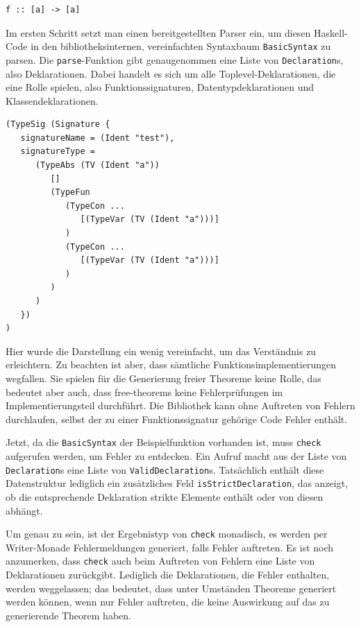 \begin{verbatim}
f :: [a] -> [a]
\end{verbatim}

Im ersten Schritt setzt man einen bereitgestellten Parser ein, um diesen Haskell-Code in den bibliotheksinternen, vereinfachten
Syntaxbaum \texttt{BasicSyntax} zu parsen. Die \texttt{parse}-Funktion gibt genaugenommen eine Liste von \texttt{Declaration}s, also Deklarationen. Dabei handelt es sich um alle Toplevel-Deklarationen, die eine Rolle spielen, also Funktionssignaturen,
Datentypdeklarationen und Klassendeklarationen.


\begin{verbatim}
(TypeSig (Signature {
   signatureName = (Ident "test"),
   signatureType =
      (TypeAbs (TV (Ident "a"))
         []
         (TypeFun
            (TypeCon ...
               [(TypeVar (TV (Ident "a")))]
            )
            (TypeCon ...
               [(TypeVar (TV (Ident "a")))]
            )
         )
      )
   })
)
\end{verbatim}

Hier wurde die Darstellung ein wenig vereinfacht, um das Verständnis zu erleichtern. Zu beachten ist aber, dass sämtliche
Funktionsimplementierungen wegfallen. Sie spielen für die Generierung freier Theoreme keine Rolle, das bedeutet aber auch,
dass free-theorems keine Fehlerprüfungen im Implementierungsteil durchführt. Die Bibliothek kann ohne Auftreten von Fehlern
durchlaufen, selbst der zu einer Funktionssignatur gehörige Code Fehler enthält.

Jetzt, da die \texttt{BasicSyntax} der Beispielfunktion vorhanden ist, muss \texttt{check} aufgerufen werden, um Fehler
zu entdecken. Ein Aufruf macht aus der Liste von \texttt{Declaration}s eine Liste von \texttt{ValidDeclaration}s. Tatsächlich
enthält diese Datenstruktur lediglich ein zusätzliches Feld \texttt{isStrictDeclaration}, das anzeigt, ob die entsprechende
Deklaration strikte Elemente enthält oder von diesen abhängt.

Um genau zu sein, ist der Ergebnistyp von \texttt{check} monadisch, es werden per Writer-Monade Fehlermeldungen
generiert, falls Fehler auftreten. Es ist noch anzumerken, dass \texttt{check} auch beim Auftreten von Fehlern eine Liste
von Deklarationen zurückgibt. Lediglich die Deklarationen, die Fehler enthalten, werden weggelassen; das bedeutet, dass
unter Umständen Theoreme generiert werden können, wenn nur Fehler auftreten, die keine Auswirkung auf das zu generierende
Theorem haben.

